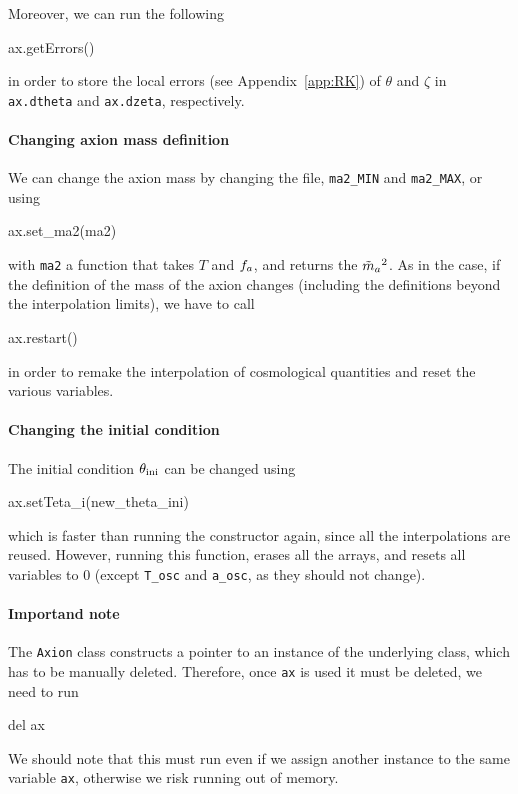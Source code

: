 \documentclass[11pt,a4paper]{article}
\begin{document}
Moreover, we can run the following
%
\begin{py}
	ax.getErrors()
\end{py}
%
in order to store the local errors (see Appendix~\ref{app:RK}) of $\theta$ and $\zeta$ in {\tt ax.dtheta} and {\tt ax.dzeta}, respectively. 

\paragraph{Changing axion mass definition}
%
We can change the axion mass by changing the file, {\tt ma2\_MIN} and {\tt ma2\_MAX}, or using 
%
\begin{cpp}
	ax.set_ma2(ma2)
\end{cpp}
%
with {\tt ma2} a function that takes $T$ and $f_{a}{}$, and returns the $\tilde m_{a}{}^2$. As in the \CPP case, if the definition of the mass of the axion changes (including the definitions beyond the interpolation limits), we have to call
%
\begin{cpp}
	ax.restart()
\end{cpp}
%
in order to remake the interpolation of cosmological quantities and reset the various variables.

\paragraph{Changing the initial condition}
%
The initial condition $\theta_{\rm ini}{}$ can be changed using 
%
\begin{py}
	ax.setTeta_i(new_theta_ini)
\end{py}
%
which is faster than running the constructor again, since all the interpolations are reused. However, running this function, erases all the arrays, and resets all variables to $0$ (except {\tt T\_osc} and {\tt a\_osc}, as they should not change). 

\paragraph{Importand note} The {\tt Axion} class constructs a pointer to an instance of the underlying  class, which has to be manually deleted. Therefore, once {\tt ax} is used it must be deleted, \ie we need to run 
%
\begin{py}
	del ax
\end{py}
%
We should note that this must run even if we assign another instance to the same variable {\tt ax}, otherwise we risk running out of memory.
\end{document}

